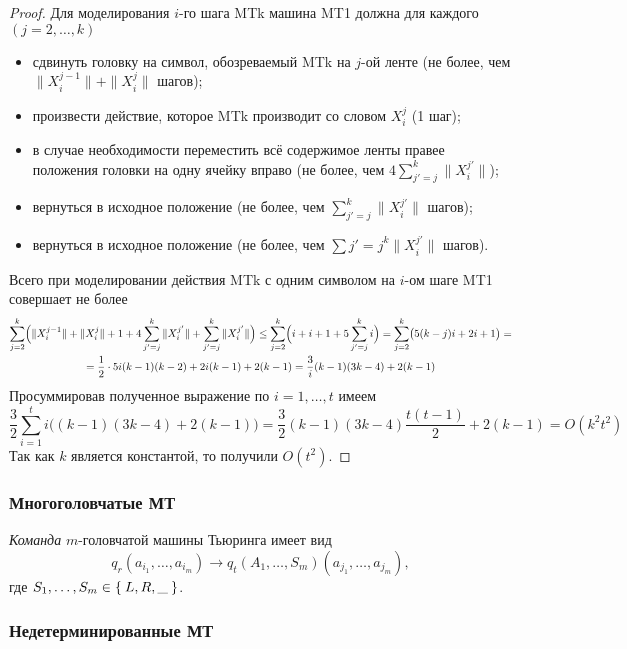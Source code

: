 \begin{proof}
	Для моделирования $ i $-го шага MTk машина MT1 должна для каждого $ (j = 2, \dots, k) $
	\begin{itemize}
		\item сдвинуть головку на символ, обозреваемый MTk на $ j $-ой ленте (не более, чем $ \| X_i^{j - 1}\| + \|X_i^j\| $ шагов);
		\item произвести действие, которое MTk производит со словом $ X_i^j $ (1 шаг);
		\item в случае необходимости переместить всё содержимое ленты правее положения головки на одну ячейку вправо (не более, чем $ 4 \sum_{j' = j}^k \|X_i^{j'}\| $);
		\item вернуться в исходное положение (не более, чем $ \sum_{j' = j}^k \|X_i^{j'}\| $ шагов);
		\item вернуться в исходное положение (не более, чем $ \sum{j' = j}^k \|X_i^{j'}\| $ шагов).
	\end{itemize}
	Всего при моделировании действия MTk с одним символом на $ i $-ом шаге MT1 совершает не более
	\begin{multline*}
		\sum_{j = 2}^k \Bigl( \|X_i^{j - 1}\| + \|X_i^j\| + 1 + 4 \sum_{j' = j}^k \|X_i^{j'}\| + \sum_{j' = j}^k \|X_i^{j'}\| \Bigr) \le \sum_{j = 2}^k \Bigl( i + i + 1 + 5 \sum_{j' = j}^k i \Bigr) = \sum_{j = 2}^k \bigl( 5 (k - j) i + 2i + 1 \bigr) = \\
		= \frac12 \cdot 5i(k - 1)(k - 2) + 2i(k - 1) + 2(k - 1) = \frac3 i (k - 1)(3k - 4) + 2(k - 1)
	\end{multline*}
	Просуммировав полученное выражение по $ i = 1, \dots, t $ имеем
	$$ \frac32 \sum_{i = 1}^t i \bigl( (k - 1)(3k - 4) + 2(k - 1) \bigr) = \frac32 (k - 1)(3k - 4) \frac{t(t - 1)}2 + 2(k - 1) = O(k^2t^2) $$
	Так как $ k $ является константой, то получили $ O(t^2) $.
\end{proof}

\subsubsection{Многоголовчатые МТ}

\begin{definition}
	\emph{Команда} $ m $-головчатой машины Тьюринга имеет вид
	$$ q_r(a_{i_1}, \dots, a_{i_m}) \to q_t(A_1, \dots, S_m)(a_{j_1}, \dots, a_{j_m}), $$
	где $ S_1, \dots, S_m \in \Set{L, R, \text\textunderscore} $.
\end{definition}

\subsubsection{Недетерминированные МТ}

